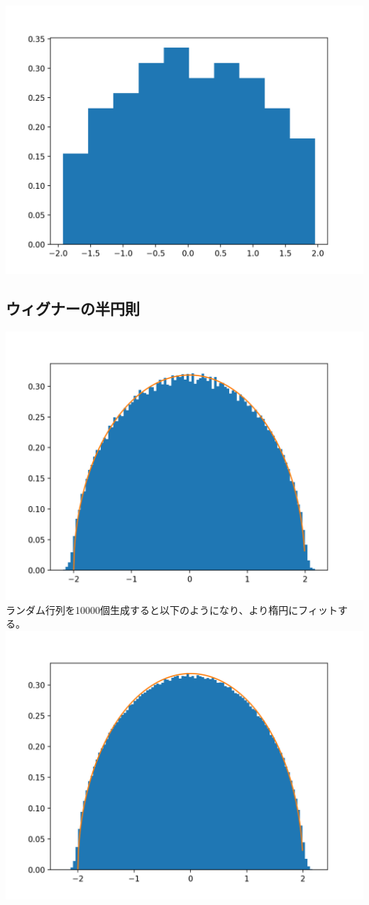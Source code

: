 \documentclass{jsarticle}
\begin{document}
\subsection{}
\includegraphics{5.png}

\subsection{ウィグナーの半円則}
\includegraphics{6.png}
\\
ランダム行列を10000個生成すると以下のようになり、より楕円にフィットする。
\\
\includegraphics{7.png}
\end{document}
